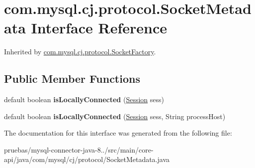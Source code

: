 \hypertarget{interfacecom_1_1mysql_1_1cj_1_1protocol_1_1_socket_metadata}{}\section{com.\+mysql.\+cj.\+protocol.\+Socket\+Metadata Interface Reference}
\label{interfacecom_1_1mysql_1_1cj_1_1protocol_1_1_socket_metadata}


Inherited by \mbox{\hyperlink{interfacecom_1_1mysql_1_1cj_1_1protocol_1_1_socket_factory}{com.\+mysql.\+cj.\+protocol.\+Socket\+Factory}}.

\subsection*{Public Member Functions}
\begin{DoxyCompactItemize}
\item 
\mbox{\label{interfacecom_1_1mysql_1_1cj_1_1protocol_1_1_socket_metadata_ae786655db2998b2391b183fdad43e02c}} 
default boolean {\bfseries is\+Locally\+Connected} (\mbox{\hyperlink{interfacecom_1_1mysql_1_1cj_1_1_session}{Session}} sess)
\item 
\mbox{\label{interfacecom_1_1mysql_1_1cj_1_1protocol_1_1_socket_metadata_a4fd9ea6b94011181271df349c840ecf0}} 
default boolean {\bfseries is\+Locally\+Connected} (\mbox{\hyperlink{interfacecom_1_1mysql_1_1cj_1_1_session}{Session}} sess, String process\+Host)
\end{DoxyCompactItemize}


The documentation for this interface was generated from the following file\+:\begin{DoxyCompactItemize}
\item 
pruebas/mysql-\/connector-\/java-\/8../src/main/core-\/api/java/com/mysql/cj/protocol/Socket\+Metadata.\+java\end{DoxyCompactItemize}
